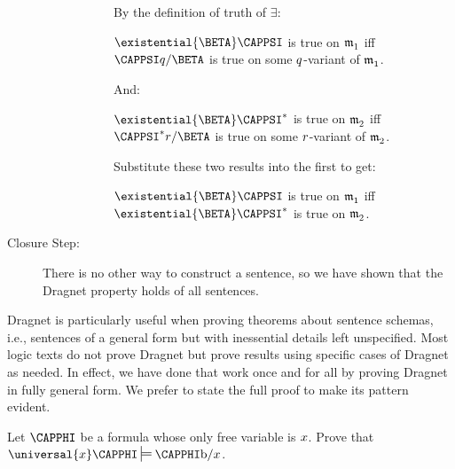 \begin{PROOF}
\begin{description}
\begin{description}
\begin{description}
	By the definition of truth of $\exists$:

	\begin{center}
		$\existential{\BETA}\CAPPSI$ is true on $\mathfrak{m^{\mathrm{}}_{\mathrm{1}}}$ iff
		$\CAPPSI\variable{q}/\BETA$ is true on some $q$-variant of $\mathfrak{m^{\mathrm{}}_{\mathrm{1}}}$.
	\end{center}

	And:

	\begin{center}
		$\existential{\BETA}\CAPPSI^*$ is true on $\mathfrak{m^{\mathrm{}}_{\mathrm{2}}}$ iff
		$\CAPPSI^*\variable{r}/\BETA$ is true on some $r$-variant of $\mathfrak{m^{\mathrm{}}_{\mathrm{2}}}$.
	\end{center}

	Substitute these two results into the first to get:

	\begin{center}
		$\existential{\BETA}\CAPPSI$ is true on $\mathfrak{m^{\mathrm{}}_{\mathrm{1}}}$
		iff $\existential{\BETA}\CAPPSI^*$ is true on $\mathfrak{m^{\mathrm{}}_{\mathrm{2}}}$.
	\end{center}

\end{description}

\end{description}

\item[Closure Step:] There is no other way to construct a \GQL{} sentence, so we have shown that the Dragnet property holds of all \GQL{} sentences.
\end{description}
\end{PROOF}

Dragnet is particularly useful when proving theorems about sentence schemas, i.e., sentences of a general form but with inessential details left unspecified.
Most logic texts do not prove Dragnet but prove results using specific cases of Dragnet as needed.
In effect, we have done that work once and for all by proving Dragnet in fully general form.
We prefer to state the full proof to make its pattern evident.

\begin{majorILnc}{}
Let $\CAPPHI$ be a formula whose only free variable is $x$.
Prove that $\universal{\variable{x}}\CAPPHI\sdtstile{}{}\CAPPHI\constant{b}/\variable{x}$.  
\end{majorILnc} 
 
